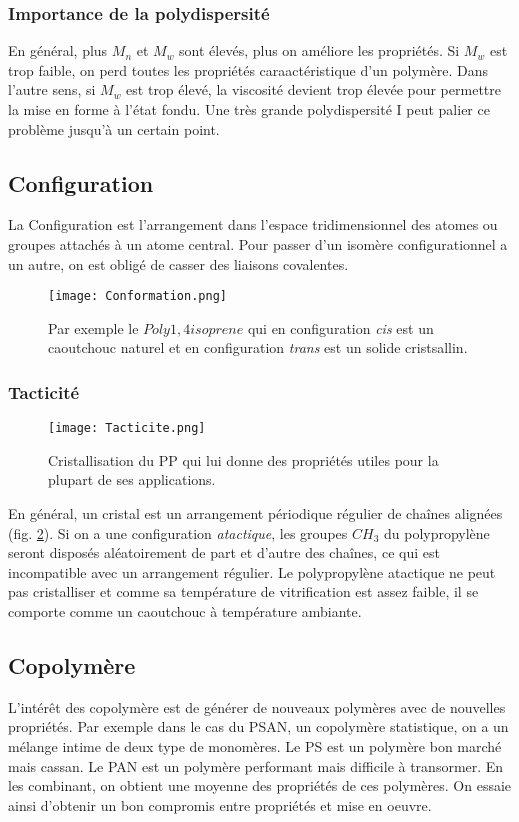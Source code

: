 \documentclass[../main.tex]{subfiles}
\begin{document}
		\subsubsection{Importance de la polydispersité}
		En général, plus $M_n$ et $M_w$ sont élevés, plus on améliore les propriétés. Si $M_w$ est trop faible, on perd toutes les propriétés caraactéristique d'un polymère.
		Dans l'autre sens, si $M_w$ est trop élevé, la viscosité devient trop élevée pour permettre la mise en forme à l'état fondu. Une très grande polydispersité I peut palier ce problème jusqu'à un certain point.
		\subsection{Configuration}
		La Configuration est l'arrangement dans l'espace tridimensionnel des atomes ou groupes attachés à un atome central. Pour passer d'un isomère configurationnel a un autre, on est obligé de casser des liaisons covalentes. 
		\begin{figure}[h]
			\begin{center}
				\texttt{[image: Conformation.png]}
				\caption{\label{conformation}Par exemple le $Poly 1,4 isoprene$ qui en configuration \textit{cis} est un caoutchouc naturel et en configuration \textit{trans} est un solide cristsallin.}
			\end{center}
		\end{figure}
	
		\subsubsection{Tacticité}
		\begin{figure}[h]
			\begin{center}
				\texttt{[image: Tacticite.png]}
				\caption{\label{tacticite}Cristallisation du PP qui lui donne des propriétés utiles pour la plupart de ses applications.}
			\end{center}
		\end{figure}
		En général, un cristal est un arrangement périodique régulier de chaînes alignées (fig. \ref{tacticite}). Si on a une configuration \textit{atactique}, les groupes $CH_3$ du polypropylène seront disposés aléatoirement de part et d'autre des chaînes, ce qui est incompatible avec un arrangement régulier. Le polypropylène atactique ne peut pas cristalliser et comme sa température de vitrification est assez faible, il se comporte comme un caoutchouc à température ambiante. 
		
		\subsection{Copolymère}
		L'intérêt des copolymère est de générer de nouveaux polymères avec de nouvelles propriétés. Par exemple dans le cas du PSAN, un copolymère statistique, on a un mélange intime de deux type de monomères. Le PS est un polymère bon marché mais cassan. Le PAN est un polymère performant mais difficile à transormer. En les combinant, on obtient une moyenne des propriétés de ces polymères. On essaie ainsi d'obtenir un bon compromis entre propriétés et mise en oeuvre.
		
		
\end{document}
